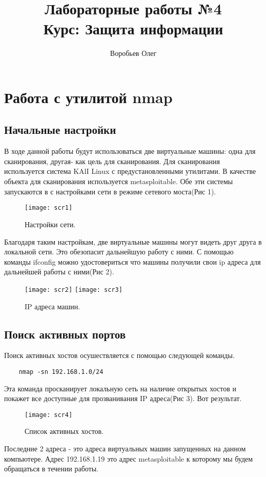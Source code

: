 \documentclass{article}
\title{Лабораторные работы №4 \\ Курс: Защита информации}
\author{Воробьев Олег}
\begin{document}
 \maketitle
 \clearpage
 \tableofcontents
 \clearpage
 
 \section{Работа с утилитой nmap}
 \subsection{Начальные настройки}
	В ходе данной работы будут использоваться две виртуальные машины: одна для сканирования, другая- как цель для сканирования. Для сканирования используется система KAlI Linux с предустановленными утилитами. В качестве объекта для сканирования используется metasploitable. Обе эти системы запускаются в с настройками сети в режиме сетевого моста(Рис 1). 
 \begin{figure}[h!]
 \centering
 \texttt{[image: scr1]}
 \caption{Настройки сети.}
 \end{figure}
 
	Благодаря таким настройкам, две виртуальные машины могут видеть друг друга в локальной сети. Это обезопасит дальнейшую работу с ними. С помощью команды ifconfig можно удостовериться что машины получили свои ip адреса для дальнейшей работы с ними(Рис 2).
 \begin{figure}
	 \centering
	 \texttt{[image: scr2]}
	 \texttt{[image: scr3]}
	 \caption{IP адреса машин.}
 \end{figure}
 \clearpage
 
 \subsection{Поиск активных портов}
 Поиск активных хостов осушествляется с помощью следующей команды.
 \begin{verbatim}
 	nmap -sn 192.168.1.0/24
 \end{verbatim}
 Эта команда просканирует локальную сеть на наличие открытых хостов и покажет все доступные для прозванивания IP адреса(Рис 3). Вот результат.
 \begin{figure}[h!]
 	\centering
 	\texttt{[image: scr4]}
 	\caption{Список активных хостов.}
 \end{figure}
 
 Последние 2 адреса - это адреса виртуальных машин запущенных на данном компьютере. Адрес 192.168.1.19 это адрес metasploitable к которому мы будем обращаться в течении работы.
 \clearpage
 
\end{document}
